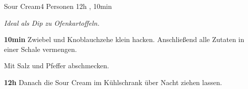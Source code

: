 \documentclass[../recipe-collections/cooking.tex]{subfiles}
\begin{document}
\begin{recipe}{Sour Cream}{4 Personen }{12h , 10min }

  \freeform{}\textit{Ideal als Dip zu Ofenkartoffeln.}


  \textbf{10min}
  Zwiebel und Knoblauchzehe klein hacken.
  Anschließend alle Zutaten in einer Schale vermengen.


  Mit Salz und Pfeffer abschmecken.

  \newstep{}\textbf{12h}
  Danach die Sour Cream im Kühlschrank über Nacht ziehen lassen.

  \freeform{}\hrulefill{}

\end{recipe}
\end{document}
